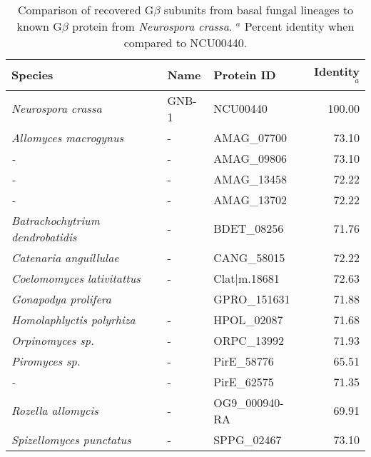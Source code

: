 \begin{table}[htbp]
\caption[G$\beta$ subunit comparison.]{Comparison of recovered G$\beta$ subunits from basal fungal lineages to known G$\beta$ protein from \textit{Neurospora crassa}. $^{a}$ Percent identity when compared to NCU00440.} 
\label{tab:ChRhodA_GBcomp}
\begin{tabular}{lllr}
  \hline
Species & Name & Protein ID & Identity$^{a}$ \\ 
  \hline
\emph{Neurospora crassa} & GNB-1 & NCU00440 & 100.00 \\ 
  \emph{Allomyces macrogynus} & - & AMAG\_07700 & 73.10 \\ 
  \emph{-} & - & AMAG\_09806 & 73.10 \\ 
  \emph{-} & - & AMAG\_13458 & 72.22 \\ 
  \emph{-} & - & AMAG\_13702 & 72.22 \\ 
  \emph{Batrachochytrium dendrobatidis} & - & BDET\_08256 & 71.76 \\ 
  \emph{Catenaria anguillulae} & - & CANG\_58015 & 72.22 \\ 
  \emph{Coelomomyces lativitattus} & - & Clat|m.18681 & 72.63 \\ 
  \emph{Gonapodya prolifera} &  & GPRO\_151631 & 71.88 \\ 
  \emph{Homolaphlyctis polyrhiza} & - & HPOL\_02087 & 71.68 \\ 
  \emph{Orpinomyces sp.} & - & ORPC\_13992 & 71.93 \\ 
  \emph{Piromyces sp.} & - & PirE\_58776 & 65.51 \\ 
  \emph{-} & - & PirE\_62575 & 71.35 \\ 
  \emph{Rozella allomycis} & - & OG9\_000940-RA & 69.91 \\ 
  \emph{Spizellomyces punctatus} & - & SPPG\_02467 & 73.10 \\ 
   \hline
\end{tabular}
\end{table}
